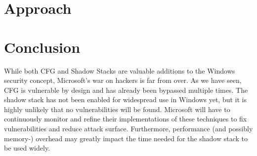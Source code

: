 \documentclass[10pt,twocolumn,a4paper]{article}
\begin{document}
\section{Approach}

\section{Conclusion}\label{sec:conclusion}

While both CFG and Shadow Stacks are valuable additions to the Windows security concept, Microsoft's war on hackers is far from over. As we have seen, CFG is vulnerable by design and has already been bypassed multiple times. The shadow stack has not been enabled for widespread use in Windows yet, but it is highly unlikely that no vulnerabilities will be found.
Microsoft will have to continuously monitor and refine their implementations of these techniques to fix vulnerabilities and reduce attack surface.
Furthermore, performance (and possibly memory-) overhead may greatly impact the time needed for the shadow stack to be used widely.



\end{document}
